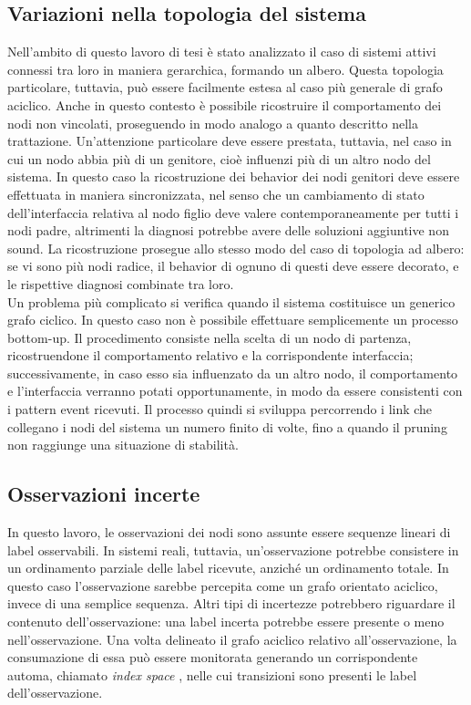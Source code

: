 \subsection{Variazioni nella topologia del sistema}
Nell'ambito di questo lavoro di tesi è stato analizzato il caso di sistemi attivi connessi tra loro in maniera gerarchica, formando un albero. Questa topologia particolare, tuttavia, può essere facilmente estesa al caso più generale di grafo aciclico. Anche in questo contesto è possibile ricostruire il comportamento dei nodi non vincolati, proseguendo in modo analogo a quanto descritto nella trattazione. Un'attenzione particolare deve essere prestata, tuttavia, nel caso in cui un nodo abbia più di un genitore, cioè influenzi più di un altro nodo del sistema. In questo caso la ricostruzione dei behavior dei nodi genitori deve essere effettuata in maniera sincronizzata, nel senso che un cambiamento di stato dell'interfaccia relativa al nodo figlio deve valere contemporaneamente  per tutti i nodi padre, altrimenti la diagnosi potrebbe avere delle soluzioni aggiuntive non sound. La ricostruzione prosegue allo stesso modo del caso di topologia ad albero: se vi sono più nodi radice, il behavior di ognuno di questi deve essere decorato, e le rispettive diagnosi combinate tra loro.\\
Un problema più complicato si verifica quando il sistema costituisce un generico grafo ciclico. In questo caso non è possibile effettuare semplicemente un processo bottom-up. Il procedimento consiste nella scelta di un nodo di partenza, ricostruendone il comportamento relativo e la corrispondente interfaccia; successivamente, in caso esso sia influenzato da un altro nodo, il comportamento e l'interfaccia verranno potati opportunamente, in modo da essere consistenti con i pattern event ricevuti. Il processo quindi si sviluppa percorrendo i link che collegano i nodi del sistema un numero finito di volte, fino a quando il pruning non raggiunge una situazione di stabilità. 

\subsection{Osservazioni incerte}
In questo lavoro, le osservazioni dei nodi sono assunte essere sequenze lineari di label osservabili. In sistemi reali, tuttavia, un'osservazione potrebbe consistere in un ordinamento parziale delle label ricevute, anziché un ordinamento totale. In questo caso l'osservazione sarebbe percepita come un grafo orientato aciclico, invece di una semplice sequenza. Altri tipi di incertezze potrebbero riguardare il contenuto dell'osservazione: una label incerta potrebbe essere presente o meno nell'osservazione. Una volta delineato il grafo aciclico relativo all'osservazione, la consumazione di essa può essere monitorata generando un corrispondente automa, chiamato \emph{index space} \cite{book:lamp,LamZan:02-aij}, nelle cui transizioni sono presenti le label dell'osservazione.


